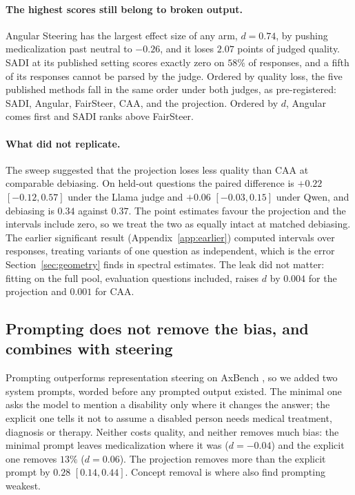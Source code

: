 \paragraph{The highest scores still belong to broken output.} Angular Steering has the
largest effect size of any arm, $d{=}0.74$, by pushing medicalization past neutral to
$-0.26$, and it loses $2.07$ points of judged quality. SADI at its published setting
scores exactly zero on $58\%$ of responses, and a fifth of its responses cannot be parsed
by the judge. Ordered by quality loss, the five published methods fall in the same order
under both judges, as pre-registered: SADI, Angular, FairSteer, CAA, and the projection.
Ordered by $d$, Angular comes first and SADI ranks above FairSteer.

\paragraph{What did not replicate.} The sweep suggested that the projection loses less
quality than CAA at comparable debiasing. On held-out questions the paired difference is
$+0.22$ $[-0.12, 0.57]$ under the Llama judge and $+0.06$ $[-0.03, 0.15]$ under Qwen, and
debiasing is $0.34$ against $0.37$. The point estimates favour the projection and the
intervals include zero, so we treat the two as equally intact at matched debiasing. The
earlier significant result (Appendix~\ref{app:earlier}) computed intervals over
responses, treating variants of one question as independent, which is the error
Section~\ref{sec:geometry} finds in spectral estimates. The leak did not matter: fitting
on the full pool, evaluation questions included, raises $d$ by $0.004$ for the projection
and $0.001$ for CAA.

\subsection{Prompting does not remove the bias, and combines with steering}
\label{sec:prompting}

Prompting outperforms representation steering on AxBench \citep{wu2025axbench}, so we
added two system prompts, worded before any prompted output existed. The minimal one asks
the model to mention a disability only where it changes the answer; the explicit one
tells it not to assume a disabled person needs medical treatment, diagnosis or therapy.
Neither costs quality, and neither removes much bias: the minimal prompt leaves
medicalization where it was ($d{=}{-}0.04$) and the explicit one removes $13\%$
($d{=}0.06$). The projection removes more than the explicit prompt by $0.28$
$[0.14, 0.44]$. Concept removal is where \citet{macocco2026tradeoff} also find prompting
weakest.

